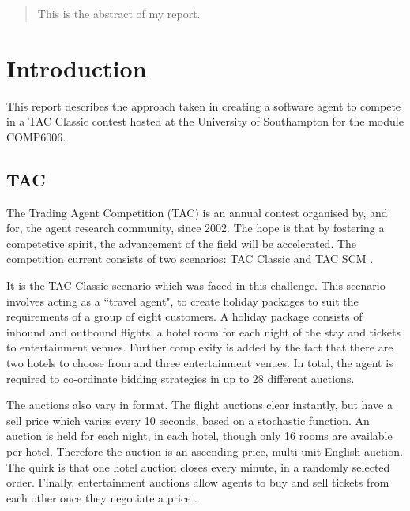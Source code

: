 \documentclass{acm_proc_article-sp}
\begin{document}
\maketitle

\begin{abstract}
 This is the abstract of my report.
\end{abstract}




\section{Introduction}

 This report describes the approach taken in creating a software agent to compete in a TAC Classic contest hosted at the University of Southampton for the module COMP6006.
 
 \subsection{TAC}
 The Trading Agent Competition (TAC) is an annual contest organised by, and for, the agent research community, since 2002.  The hope is that by fostering a competetive spirit, the advancement of the field will be accelerated.  The competition current consists of two scenarios: TAC Classic and TAC SCM \cite{SICS2007a}.
 
 It is the TAC Classic scenario which was faced in this challenge.  This scenario involves acting as a ``travel agent", to create holiday packages to suit the requirements of a group of eight customers.  A holiday package consists of inbound and outbound flights, a hotel room for each night of the stay and tickets to entertainment venues.  Further complexity is added by the fact that there are two hotels to choose from and three entertainment venues.  In total, the agent is required to co-ordinate bidding strategies in up to 28 different auctions.
 
 The auctions also vary in format.  The flight auctions clear instantly, but have a sell price which varies every 10 seconds, based on a stochastic function.  An auction is held for each night, in each hotel, though only 16 rooms are available per hotel.  Therefore the auction is an ascending-price, multi-unit English auction.  The quirk is that one hotel auction closes every minute, in a randomly selected order.  Finally, entertainment auctions allow agents to buy and sell tickets from each other once they negotiate a price \cite{SICS2007b}.
 
\end{document}
